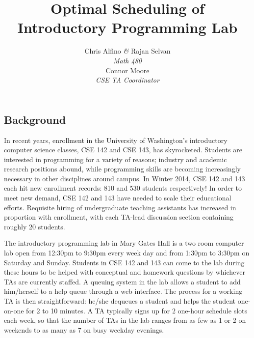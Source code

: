 \documentclass{article}
\begin{document}
\title{\textbf{Optimal Scheduling of Introductory Programming Lab}}
\author{
   Chris Alfino \textit{\&} Rajan Selvan\\
   \vspace{12pt}
   \small\textit{Math 480}\\
   Connor Moore\\
   \small\textit{CSE TA Coordinator}}
\date{}

\maketitle
\noindent\makebox[\linewidth]{\rule{\textwidth}{0.4pt}}

\setlength\columnsep{0.45in}
\setlength{\parskip}{0.5em}
\begin{multicols}{2}

\section*{Background}

In recent years, enrollment in the University of Washington's introductory computer science classes, CSE 142 and CSE 143, has skyrocketed. Students are interested in programming for a variety of reasons; industry and academic research positions abound, while programming skills are becoming increasingly necessary in other disciplines around campus. In Winter 2014, CSE 142 and 143 each hit new enrollment records: 810 and 530 students respectively! In order to meet new demand, CSE 142 and 143 have needed to scale their educational efforts. Requisite hiring of undergraduate teaching assistants has increased in proportion with enrollment, with each TA-lead discussion section containing roughly 20 students.

The introductory programming lab in Mary Gates Hall is a two room computer lab open from 12:30pm to 9:30pm every week day and from 1:30pm to 3:30pm on Saturday and Sunday. Students in CSE 142 and 143 can come to the lab during these hours to be helped with conceptual and homework questions by whichever TAs are currently staffed. A queuing system in the lab allows a student to add him/herself to a help queue through a web interface. The process for a working TA is then straightforward: he/she dequeues a student and helps the student one-on-one for 2 to 10 minutes. A TA typically signs up for 2 one-hour schedule slots each week, so that the number of TAs in the lab ranges from as few as 1 or 2 on weekends to as many as 7 on busy weekday evenings.


\end{multicols}
\end{document}
